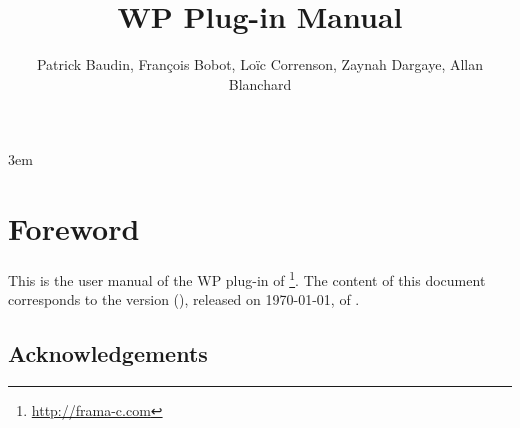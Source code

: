 \documentclass{frama-c-book}
\title{WP Plug-in Manual}
\author{Patrick Baudin, François Bobot, Loïc Correnson, Zaynah Dargaye, Allan Blanchard}
\newcommand{\FCVERSION}{(\unskip)}
\begin{document}
\sloppy
\emergencystretch 3em

\maketitle
\tableofcontents

\chapter*{Foreword}
\markright{}

This is the user manual of the WP plug-in of \FramaC\footnote{\url{http://frama-c.com}}.
The content of this document corresponds to the version \FCVERSION, released on \today, of
\FramaC.

\section*{Acknowledgements}

\medskip










\end{document}

